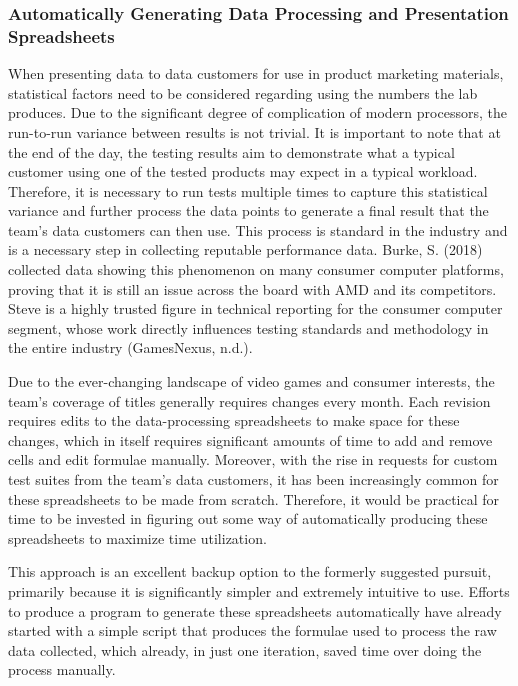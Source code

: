 \documentclass[12pt]{article}
\begin{document}
\subsubsection{Automatically Generating Data Processing and Presentation Spreadsheets}
\indent\hspace{0.5in} When presenting data to data customers for use in product marketing materials, statistical factors need to be considered regarding using the numbers the lab produces. Due to the significant degree of complication of modern processors, the run-to-run variance between results is not trivial. It is important to note that at the end of the day, the testing results aim to demonstrate what a typical customer using one of the tested products may expect in a typical workload. Therefore, it is necessary to run tests multiple times to capture this statistical variance and further process the data points to generate a final result that the team's data customers can then use. This process is standard in the industry and is a necessary step in collecting reputable performance data. Burke, S. (2018) collected data showing this phenomenon on many consumer computer platforms, proving that it is still an issue across the board with AMD and its competitors. Steve is a highly trusted figure in technical reporting for the consumer computer segment, whose work directly influences testing standards and methodology in the entire industry (GamesNexus, n.d.).  

\indent\hspace{0.5in} Due to the ever-changing landscape of video games and consumer interests, the team's coverage of titles generally requires changes every month. Each revision requires edits to the data-processing spreadsheets to make space for these changes, which in itself requires significant amounts of time to add and remove cells and edit formulae manually. Moreover, with the rise in requests for custom test suites from the team's data customers, it has been increasingly common for these spreadsheets to be made from scratch. Therefore, it would be practical for time to be invested in figuring out some way of automatically producing these spreadsheets to maximize time utilization.
	
\indent\hspace{0.5in} This approach is an excellent backup option to the formerly suggested pursuit, primarily because it is significantly simpler and extremely intuitive to use. Efforts to produce a program to generate these spreadsheets automatically have already started with a simple script that produces the formulae used to process the raw data collected, which already, in just one iteration, saved time over doing the process manually.
\end{document}
